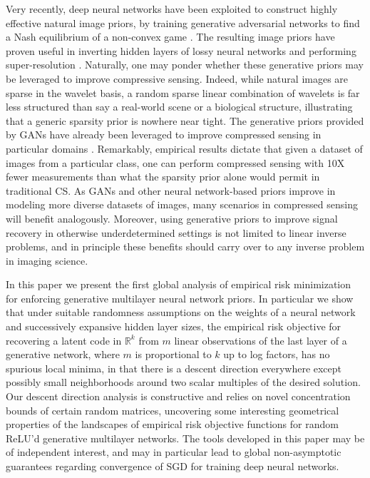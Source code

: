 \documentclass[final,12pt]{colt2018}
\begin{document}
Very recently, deep neural networks have been exploited to construct highly effective natural image priors, by training generative adversarial networks to find a Nash equilibrium of a non-convex game \citep{GAN}. The resulting image priors have proven useful in inverting hidden layers of lossy neural networks \citep{Yosinski} and performing super-resolution \citep{DLSR}. Naturally, one may ponder whether these generative priors may be leveraged to improve compressive sensing. Indeed, while natural images are sparse in the wavelet basis, a random sparse linear combination of wavelets is far less structured than say a real-world scene or a biological structure, illustrating that a generic sparsity prior is nowhere near tight. The generative priors provided by GANs have already been leveraged to improve compressed sensing in particular domains \citep{Price}. Remarkably, empirical results \citep{Price} dictate that given a dataset of images from a particular class, one can perform compressed sensing with 10X fewer measurements than what the sparsity prior alone would permit in traditional CS. As GANs and other neural network-based priors improve in modeling more diverse datasets of images, many scenarios in compressed sensing will benefit analogously. Moreover, using generative priors to improve signal recovery in otherwise underdetermined settings is not limited to linear inverse problems, and in principle these benefits should carry over to any inverse problem in imaging science. 

In this paper we present the first global analysis of empirical risk minimization for enforcing generative multilayer neural network priors. In particular we show that under suitable randomness assumptions on the weights of a neural network and successively expansive hidden layer sizes, the empirical risk objective for recovering a latent code in $\mathbb{R}^k$ from $m$ linear observations of the last layer of a generative network, where $m$ is proportional to $k$ up to log factors, has no spurious local minima, in that there is a descent direction everywhere except possibly small neighborhoods around two scalar multiples of the desired solution. Our descent direction analysis is constructive and relies on novel concentration bounds of certain random matrices, uncovering some interesting geometrical properties of the landscapes of empirical risk objective functions for random ReLU'd generative multilayer networks. The tools developed in this paper may be of independent interest, and may in particular lead to global non-asymptotic guarantees regarding convergence of SGD for training deep neural networks. 
\end{document}
